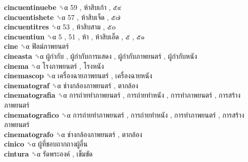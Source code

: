 \textbf{cincuentinuebe} ␝α   59 ,  ห้าสิบเก้า ,  ๕๙   \\
\textbf{cincuentishete} ␝α   57 ,  ห้าสิบเจ็ด ,  ๕๗   \\
\textbf{cincuentitres} ␝α   53 ,  ห้าสิบสาม ,  ๕๓   \\
\textbf{cincuentiun} ␝α   5 ,  51 ,  ห้า ,  ห้าสิบเอ็ด ,  ๕ ,  ๕๑   \\
\textbf{cine} ␝α   ฟิลม์ภาพยนตร์   \\
\textbf{cineasta} ␝α   ผู้กำกับ ,  ผู้กำกับการแสดง ,  ผู้กำกับภาพยนตร์ ,  ผู้กำกับหนัง   \\
\textbf{cinema} ␝α   โรงภาพยนตร์ ,  โรงหนัง   \\
\textbf{cinemascop} ␝α   เครื่องฉายภาพยนตร์ ,  เครื่องฉายหนัง   \\
\textbf{cinematograf} ␝α   ช่างกล้องภาพยนตร์ ,  ตากล้อง   \\
\textbf{cinematografia} ␝α   การถ่ายทำภาพยนตร์ ,  การถ่ายทำหนัง ,  การทำภาพยนตร์ ,  การสร้างภาพยนตร์   \\
\textbf{cinematografico} ␝α   การถ่ายทำภาพยนตร์ ,  การถ่ายทำหนัง ,  การทำภาพยนตร์ ,  การสร้างภาพยนตร์   \\
\textbf{cinematografo} ␝α   ช่างกล้องภาพยนตร์ ,  ตากล้อง   \\
\textbf{cinico} ␝α   ผู้ที่ชอบถากถางผู้อื่น   \\
\textbf{cintura} ␝α   รัดพระองค์ ,  เข็มขัด   \\
